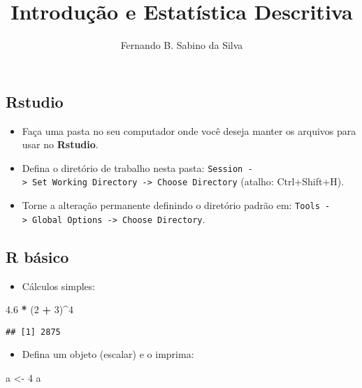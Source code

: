 \documentclass[]{article}
\title{Introdução e Estatística Descritiva}
\author{Fernando B. Sabino da Silva}
\date{}
\newenvironment{Shaded}{\begin{snugshade}}{\end{snugshade}}
\newcommand{\DecValTok}[1]{\textcolor[rgb]{0.00,0.00,0.81}{#1}}
\newcommand{\FloatTok}[1]{\textcolor[rgb]{0.00,0.00,0.81}{#1}}
\newcommand{\StringTok}[1]{\textcolor[rgb]{0.31,0.60,0.02}{#1}}
\newcommand{\OperatorTok}[1]{\textcolor[rgb]{0.81,0.36,0.00}{\textbf{#1}}}
\newcommand{\NormalTok}[1]{#1}
\providecommand{\tightlist}{%
  \setlength{\itemsep}{0pt}\setlength{\parskip}{0pt}}
\begin{document}
\maketitle

{
\setcounter{tocdepth}{2}
\tableofcontents
}
\subsection{\texorpdfstring{\textbf{Rstudio}}{Rstudio}}\label{rstudio}

\begin{itemize}
\tightlist
\item
  Faça uma pasta no seu computador onde você deseja manter os arquivos
  para usar no \textbf{Rstudio}.
\item
  Defina o diretório de trabalho nesta pasta:
  \texttt{Session\ -\textgreater{}\ Set\ Working\ Directory\ -\textgreater{}\ Choose\ Directory}
  (atalho: Ctrl+Shift+H).
\item
  Torne a alteração permanente definindo o diretório padrão em:
  \texttt{Tools\ -\textgreater{}\ Global\ Options\ -\textgreater{}\ Choose\ Directory}.
\end{itemize}

\subsection{\texorpdfstring{\textbf{R}
básico}{R básico}}\label{r-basico}

\begin{itemize}
\tightlist
\item
  Cálculos simples:
\end{itemize}

\begin{Shaded}
\begin{Highlighting}[]
\FloatTok{4.6} \OperatorTok{*}\StringTok{ }\NormalTok{(}\DecValTok{2} \OperatorTok{+}\StringTok{ }\DecValTok{3}\NormalTok{)}\OperatorTok{^}\DecValTok{4} 
\end{Highlighting}
\end{Shaded}

\begin{verbatim}
## [1] 2875
\end{verbatim}

\begin{itemize}
\tightlist
\item
  Defina um objeto (escalar) e o imprima:
\end{itemize}

\begin{Shaded}
\begin{Highlighting}[]
\NormalTok{a <-}\StringTok{ }\DecValTok{4} 
\NormalTok{a}
\end{Highlighting}
\end{Shaded}
\end{document}
